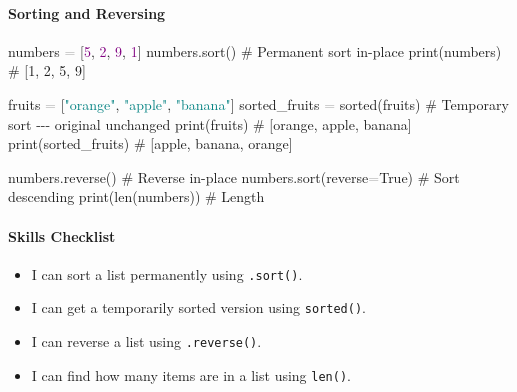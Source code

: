 \documentclass[
  justified,
  openright,
]{tufte-book}
\let\subsubsection\paragraph
\let\paragraph\paragraph
\newcommand{\BuiltInTok}[1]{#1}
\newcommand{\CommentTok}[1]{\textcolor{MidGray}{#1}}
\newcommand{\DecValTok}[1]{\textcolor{Purple}{#1}}
\newcommand{\NormalTok}[1]{#1}
\newcommand{\OperatorTok}[1]{\textcolor{DarkGray}{#1}}
\newcommand{\StringTok}[1]{\textcolor{Teal}{#1}}
\newcommand{\VariableTok}[1]{#1}
\newenvironment{Shaded}{%
  \begin{snugshade}
}{%
  \end{snugshade}
}
\let\subsubsection\paragraph
\let\paragraph\paragraph
\providecommand{\tightlist}{%
  \setlength{\itemsep}{0pt}\setlength{\parskip}{0pt}}
\begin{document}
\subsubsection{Sorting and Reversing}\label{sorting-and-reversing}

\begin{Shaded}
\begin{Highlighting}[]
\NormalTok{numbers }\OperatorTok{=}\NormalTok{ [}\DecValTok{5}\NormalTok{, }\DecValTok{2}\NormalTok{, }\DecValTok{9}\NormalTok{, }\DecValTok{1}\NormalTok{]}
\NormalTok{numbers.sort()                          }\CommentTok{\# Permanent sort in{-}place}
\BuiltInTok{print}\NormalTok{(numbers)                          }\CommentTok{\# [1, 2, 5, 9]}

\NormalTok{fruits }\OperatorTok{=}\NormalTok{ [}\StringTok{"orange"}\NormalTok{, }\StringTok{"apple"}\NormalTok{, }\StringTok{"banana"}\NormalTok{]}
\NormalTok{sorted\_fruits }\OperatorTok{=} \BuiltInTok{sorted}\NormalTok{(fruits)          }\CommentTok{\# Temporary sort {-}{-}{-} original unchanged}
\BuiltInTok{print}\NormalTok{(fruits)                           }\CommentTok{\# [\textquotesingle{}orange\textquotesingle{}, \textquotesingle{}apple\textquotesingle{}, \textquotesingle{}banana\textquotesingle{}]}
\BuiltInTok{print}\NormalTok{(sorted\_fruits)                    }\CommentTok{\# [\textquotesingle{}apple\textquotesingle{}, \textquotesingle{}banana\textquotesingle{}, \textquotesingle{}orange\textquotesingle{}]}

\NormalTok{numbers.reverse()                       }\CommentTok{\# Reverse in{-}place}
\NormalTok{numbers.sort(reverse}\OperatorTok{=}\VariableTok{True}\NormalTok{)              }\CommentTok{\# Sort descending}
\BuiltInTok{print}\NormalTok{(}\BuiltInTok{len}\NormalTok{(numbers))                     }\CommentTok{\# Length}
\end{Highlighting}
\end{Shaded}

\subsubsection{Skills Checklist}\label{skills-checklist-18}

\begin{itemize}
\tightlist
\item[$\square$]
  I can sort a list permanently using \texttt{.sort()}.
\item[$\square$]
  I can get a temporarily sorted version using \texttt{sorted()}.
\item[$\square$]
  I can reverse a list using \texttt{.reverse()}.
\item[$\square$]
  I can find how many items are in a list using \texttt{len()}.
\end{itemize}
\end{document}
